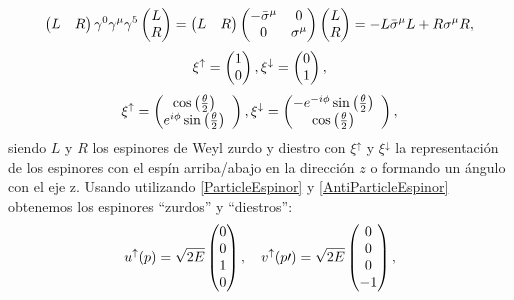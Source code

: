 \documentclass{article}
\theoremstyle{plain}
\theoremstyle{definition}
\begin{document}
	\begin{equation}\label{WeylEspinors2}
	\left(\begin{array}{@{}cc@{}}
	L&
	R 
	\end{array}\right)
	\gamma^0\gamma^\mu\gamma^5 \left(\begin{array}{@{}c@{}}
	L\\
	R 
	\end{array}\right) = \left(\begin{array}{@{}cc@{}}
	L&
	R 
	\end{array}\right)
	\left(\begin{array}{@{}cc@{}}
	-\bar{\sigma}^{\mu} & 0\\
	0 & \sigma^{\mu} 
	\end{array}\right)
	\left(\begin{array}{@{}c@{}}
	L\\
	R 
	\end{array}\right) = -L\bar{\sigma}^{\mu}L + R\sigma^{\mu}R, 
	\end{equation}
	\[
	\xi^\uparrow = \left(\begin{array}{@{}c@{}}
	1\\
	0
	\end{array}\right),
	\xi^\downarrow = \left(\begin{array}{@{}c@{}}
	0\\
	1
	\end{array}\right),
	\]
	\[
	\xi^\uparrow = \left(\begin{array}{@{}cc@{}}
	\cos\left(\frac{\theta}{2}\right)\\
	e^{i\phi}\sin\left(\frac{\theta}{2}\right)
	\end{array}\right),
	\xi^\downarrow = \left(\begin{array}{@{}cc@{}}
	-e^{-i\phi}\sin\left(\frac{\theta}{2}\right)\\
	\cos\left(\frac{\theta}{2}\right)
	\end{array}\right),
	\]
	siendo \(L\) y \(R\) los espinores de Weyl zurdo y diestro con \(\xi^\uparrow \) y \(\xi^\downarrow \) la representación de los espinores con el espín arriba/abajo en la dirección \(z\) o formando un ángulo con el eje z. Usando utilizando \eqref{ParticleEspinor} y \eqref{AntiParticleEspinor} obtenemos los espinores ``zurdos'' y ``diestros'':	
	\[
	u^\uparrow(p) = \sqrt{2E}\left(\begin{array}{@{}c@{}}
	0\\
	0\\
	1\\
	0\end{array}\right),
	\quad 
	v^\uparrow(p\prime) = \sqrt{2E}
	\left(\begin{array}{@{}c@{}}
	0\\
	0\\
	0\\
	-1\end{array}\right),  
\]
\end{document}
